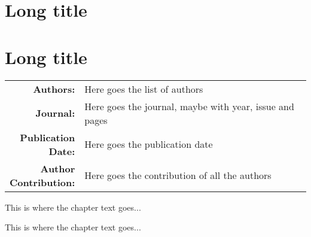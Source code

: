 \documentclass[../main.tex]{subfiles}
\begin{document}
\chapter[Short title]{Long title}
\label{cha:label}

	\chapter[Short title]{Long title}
	\label{cha:label} %
	
	{\renewcommand{\arraystretch}{2.0} %
		\begin{table}[h]
			\begin{tabularx}{\textwidth}{>{\bfseries}r X}
				
				Authors: & Here goes the list of authors \\ 
				Journal: & Here goes the journal, maybe with year, issue and pages \\  
				\makecell[tr]{Publication \\ Date:} & Here goes the publication date \\
				\makecell[tr]{Author \\ Contribution:} & Here goes the contribution of all the authors \\
				
			\end{tabularx}
		\end{table}
	}
	
	\clearpage %
	
	This is where the chapter text goes...

This is where the chapter text goes...

\biblio
\end{document}
